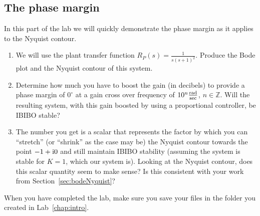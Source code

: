 \subsection{The phase margin}

In this part of the lab we will quickly demonstrate the phase margin as it
applies to the Nyquist contour.
\begin{enumerate}
    \item We will use the plant transfer function
          \(R_{P}(s)=\frac{1}{s{(s+1)}^{2}}\).  Produce the Bode plot and the Nyquist
          contour of this system.

    \item Determine how much you have to boost the gain (in decibels) to provide
          a phase margin of \(0^{\circ}\) at a gain cross over frequency of
          \(10^{n}\frac{\textup{rad}}{\textup{sec}}\), \(n\in\mathbb{Z}\).  Will the %
          resulting system, with this gain boosted by using a proportional controller,
          be IBIBO stable?

    \item The number you get is a scalar that represents the factor by which you
          can ``stretch'' (or ``shrink'' as the case may be) the Nyquist contour
          towards the point \(-1+\textup{i}0\) and still maintain IBIBO stability (assuming
          the system is stable for \(K=1\), which our system is).  Looking at the Nyquist
          contour, does this scalar quantity seem to make sense?  Is this consistent
          with your work from Section~\ref{sec:bodeNyquist}?
\end{enumerate}

When you have completed the lab, make sure you save your files in the folder
you created in Lab~\ref{chap:intro}\@.

